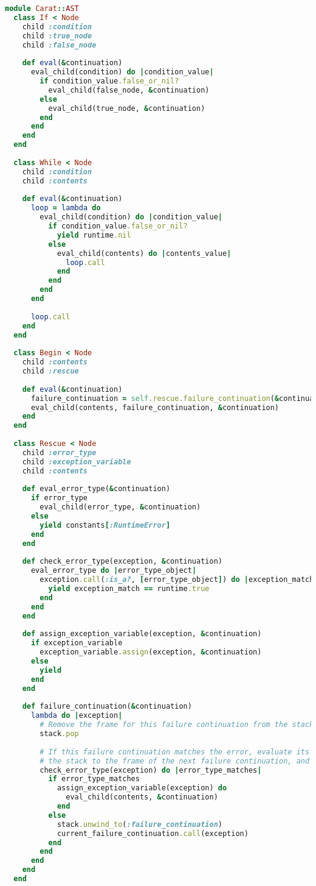 \begin{lstlisting}[title={\small\ttfamily\bfseries ast/control.rb},language=Ruby]
module Carat::AST
  class If < Node
    child :condition
    child :true_node
    child :false_node
    
    def eval(&continuation)
      eval_child(condition) do |condition_value|
        if condition_value.false_or_nil?
          eval_child(false_node, &continuation)
        else
          eval_child(true_node, &continuation)
        end
      end
    end
  end
  
  class While < Node
    child :condition
    child :contents
    
    def eval(&continuation)
      loop = lambda do
        eval_child(condition) do |condition_value|
          if condition_value.false_or_nil?
            yield runtime.nil
          else
            eval_child(contents) do |contents_value|
              loop.call
            end
          end
        end
      end
      
      loop.call
    end
  end
  
  class Begin < Node
    child :contents
    child :rescue
    
    def eval(&continuation)
      failure_continuation = self.rescue.failure_continuation(&continuation) if self.rescue
      eval_child(contents, failure_continuation, &continuation)
    end
  end
  
  class Rescue < Node
    child :error_type
    child :exception_variable
    child :contents
    
    def eval_error_type(&continuation)
      if error_type
        eval_child(error_type, &continuation)
      else
        yield constants[:RuntimeError]
      end
    end
    
    def check_error_type(exception, &continuation)
      eval_error_type do |error_type_object|
        exception.call(:is_a?, [error_type_object]) do |exception_match|
          yield exception_match == runtime.true
        end
      end
    end
    
    def assign_exception_variable(exception, &continuation)
      if exception_variable
        exception_variable.assign(exception, &continuation)
      else
        yield
      end
    end
    
    def failure_continuation(&continuation)
      lambda do |exception|
        # Remove the frame for this failure continuation from the stack
        stack.pop
        
        # If this failure continuation matches the error, evaluate its contents. Otherwise, unwind
        # the stack to the frame of the next failure continuation, and call that.
        check_error_type(exception) do |error_type_matches|
          if error_type_matches
            assign_exception_variable(exception) do
              eval_child(contents, &continuation)
            end
          else
            stack.unwind_to(:failure_continuation)
            current_failure_continuation.call(exception)
          end
        end
      end
    end
  end
  

\end{lstlisting}
